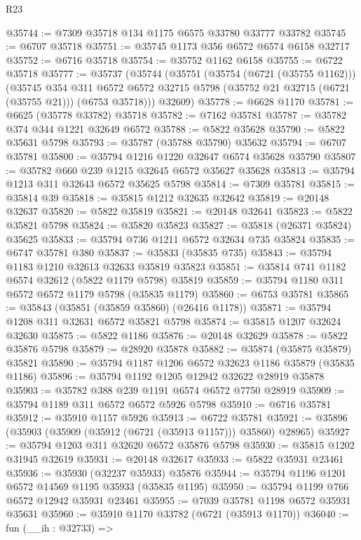 \begin{lexlean}{R23}
\begin{coremodule}
@35744 := @7309 @35718 @134 @1175 @6575 @33780 @33777 @33782
@35745 := @6707 @35718
@35751 := @35745 @1173 @356 @6572 @6574 @6158 @32717
@35752 := @6716 @35718
@35754 := @35752 @1162 @6158
@35755 := @6722 @35718
@35777 := @35737
    (@35744
      (@35751
        (@35754 (@6721 (@35755 @1162)))
        (@35745
          @354
          @311
          @6572
          @6572
          @32715
          @5798
          (@35752 @21 @32715 (@6721 (@35755 @21)))
          (@6753 @35718)))
      @32609)
@35778 := @6628 @1170
@35781 := @6625 (@35778 @33782) @35718
@35782 := @7162 @35781
@35787 := @35782 @374 @344 @1221 @32649 @6572
@35788 := @5822 @35628
@35790 := @5822 @35631 @5798
@35793 := @35787 (@35788 @35790) @35632
@35794 := @6707 @35781
@35800 := @35794 @1216 @1220 @32647 @6574 @35628 @35790
@35807 := @35782 @660 @239 @1215 @32645 @6572 @35627 @35628
@35813 := @35794 @1213 @311 @32643 @6572 @35625 @5798
@35814 := @7309 @35781
@35815 := @35814 @39
@35818 := @35815 @1212 @32635 @32642
@35819 := @20148 @32637
@35820 := @5822 @35819
@35821 := @20148 @32641
@35823 := @5822 @35821 @5798
@35824 := @35820 @35823
@35827 := @35818 (@26371 @35824) @35625
@35833 := @35794 @736 @1211 @6572 @32634 @735 @35824
@35835 := @6747 @35781 @380
@35837 := @35833 (@35835 @735)
@35843 := @35794 @1183 @1210 @32613 @32633 @35819 @35823
@35851 := @35814 @741 @1182 @6574 @32612 (@5822 @1179 @5798) @35819
@35859 := @35794 @1180 @311 @6572 @6572 @1179 @5798 (@35835 @1179)
@35860 := @6753 @35781
@35865 := @35843 (@35851 (@35859 @35860) (@26416 @1178))
@35871 := @35794 @1208 @311 @32631 @6572 @35821 @5798
@35874 := @35815 @1207 @32624 @32630
@35875 := @5822 @1186
@35876 := @20148 @32629
@35878 := @5822 @35876 @5798
@35879 := @28920 @35878
@35882 := @35874 (@35875 @35879) @35821
@35890 := @35794 @1187 @1206 @6572 @32623 @1186 @35879 (@35835 @1186)
@35896 := @35794 @1192 @1205 @12942 @32622 @28919 @35878
@35903 := @35782 @388 @239 @1191 @6574 @6572 @7750 @28919
@35909 := @35794 @1189 @311 @6572 @6572 @5926 @5798
@35910 := @6716 @35781
@35912 := @35910 @1157 @5926
@35913 := @6722 @35781
@35921 := @35896 (@35903 (@35909 (@35912 (@6721 (@35913 @1157))) @35860) @28965)
@35927 := @35794 @1203 @311 @32620 @6572 @35876 @5798
@35930 := @35815 @1202 @31945 @32619
@35931 := @20148 @32617
@35933 := @5822 @35931 @23461
@35936 := @35930 (@32237 @35933) @35876
@35944 := @35794 @1196 @1201 @6572 @14569 @1195 @35933 (@35835 @1195)
@35950 := @35794 @1199 @766 @6572 @12942 @35931 @23461
@35955 := @7039 @35781 @1198 @6572 @35931 @35631
@35960 := @35910 @1170 @33782 (@6721 (@35913 @1170))
@36040 := fun (__ih : @32733) =>

\end{coremodule}
\end{lexlean}
